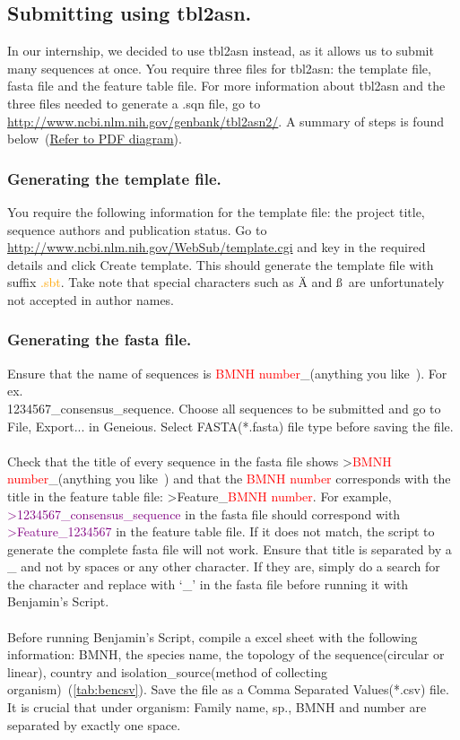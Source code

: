 \documentclass[11pt]{article}
\begin{document}
\subsection{Submitting using tbl2asn.}
In our internship, we decided to use tbl2asn instead, as it allows us to submit many sequences at once. You require three files for tbl2asn: the template file, fasta file and the feature table file. For more information about tbl2asn and the three files needed to generate a .sqn file, go to \url{http://www.ncbi.nlm.nih.gov/genbank/tbl2asn2/}. A summary of steps is found below~(\hyperref[pdf:template]{Refer to PDF diagram}).

\subsubsection{Generating the template file.}
\label{subsubsec:template}
You require the following information for the template file: the project title, sequence authors and publication status. Go to \url{http://www.ncbi.nlm.nih.gov/WebSub/template.cgi} and key in the required details and click Create template. This should generate the template file with suffix \textcolor{orange}{.sbt}. Take note that special characters such as \"{A} and \ss~are unfortunately not accepted in author names.


\subsubsection{Generating the fasta file.}
\label{subsubsec:fasta}
Ensure that the name of sequences is \textcolor{red}{BMNH number}\_(anything you like~\smiley). For ex. \\ 
1234567\_consensus\_sequence. Choose all sequences to be submitted and go to File, Export... in Geneious. Select FASTA(*.fasta) file type before saving the file. 
\\
\\
Check that the title of every sequence in the fasta file shows \textgreater\textcolor{red}{BMNH number}\_(anything you like~\smiley) and that the \textcolor{red}{BMNH number} corresponds with the title in the feature table file: \textgreater Feature\_\textcolor{red}{BMNH number}. For example, \textcolor{purple}{\textgreater1234567\_consensus\_sequence} in the fasta file should correspond with \textcolor{purple}{\textgreater Feature\_1234567} in the feature table file. If it does not match, the script to generate the complete fasta file will not work. Ensure that title is separated by a \_ and not by spaces or any other character. If they are, simply do a search for the character and replace with `\_' in the fasta file before running it with Benjamin's Script. 
\\
\\
Before running Benjamin's Script, compile a excel sheet with the following information: BMNH, the species name, the topology of the sequence(circular or linear), country and isolation\_source(method of collecting organism)~(\autoref{tab:bencsv}). Save the file as a Comma Separated Values(*.csv) file. It is crucial that under organism: Family name, sp., BMNH and number are separated by exactly one space.
\end{document}

